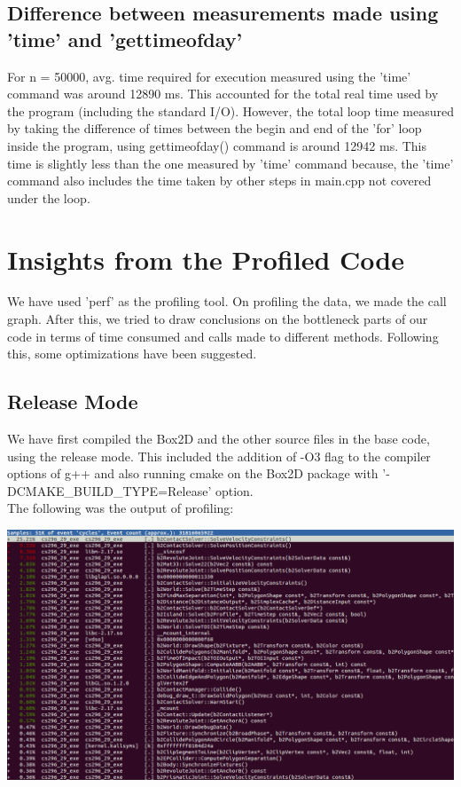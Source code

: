 \documentclass[11pt]{article}
\begin{document}
\subsection{Difference between measurements made using 'time' and 'gettimeofday'}
For n = 50000, avg. time required for execution measured using the 'time' command was around 12890 ms. This accounted for the total real time used by the program (including the standard I/O). However, the total loop time measured by taking the difference of times between the begin and end of the 'for' loop inside the program, using gettimeofday() command is around 12942 ms. This time is slightly less than the one measured by 'time' command because, the 'time' command also includes the time taken by other steps in main.cpp not covered under the loop.\\


\section{Insights from the Profiled Code}

We have used 'perf' as the profiling tool. On profiling the data, we made the call graph. After this, we tried to draw conclusions on the bottleneck parts of our code in terms of time consumed and calls made to different methods. Following this, some optimizations have been suggested.

\subsection{Release Mode}
We have first compiled the Box2D and the other source files in the base code, using the release mode. This included the addition of -O3 flag to the compiler options of g++ and also running cmake on the Box2D package with '-DCMAKE\_BUILD\_TYPE=Release' option. \\
The following was the output of profiling: \\ 

\begin{center} 
\includegraphics [scale=0.4]{./images/release} 
\end{center}
\end{document}
